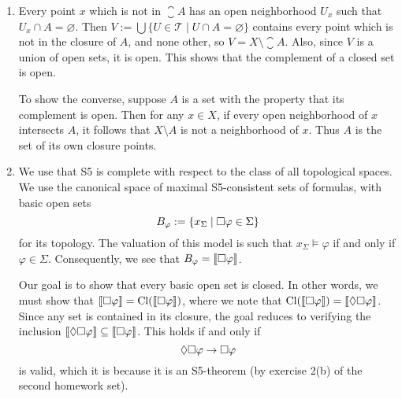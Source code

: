 \documentclass{article}
\newcommand{\topology}{{\mathcal{T}}}
\begin{document}
\maketitle

\begin{ex}
\begin{enumerate}
\item Every point $x$ which is not in $\closure{A}$ has an open neighborhood
$U_x$ such that $U_x\cap A=\varnothing$. Then $V:=\bigcup\{U\in\topology\mid
U\cap A=\varnothing\}$ contains every point which is not in the closure of $A$,
and none other, so $V=X\setminus\closure{A}$. Also, since $V$ is a union of
open sets, it is open. This shows that the complement of a closed set is open.

To show the converse, suppose $A$ is a set with the property that its complement
is open. Then for any $x\in X$, if every open neighborhood of $x$ intersects $A$, it follows that
$X\setminus A$ is not a neighborhood of $x$. Thus $A$ is the set of its own
closure points.

\item We use that \textsf{S5} is complete with respect to the class of all
topological spaces. We use the canonical space of maximal \textsf{S5}-consistent
sets of formulas, with basic open sets
\begin{equation*}
B_{\varphi}:=\{x_\Sigma\mid\square\varphi\in\Sigma\}
\end{equation*}
for its topology. The valuation of this model is such that $x_\Sigma\models\varphi$
if and only if $\varphi\in\Sigma$. Consequently, we see that 
$B_\varphi=\llbracket\square\varphi\rrbracket$.

Our goal is to show that every basic open set is closed. In other words, we must
show that $\llbracket\square\varphi\rrbracket=\mathrm{Cl}(\llbracket\square\varphi\rrbracket)$, where we note
that $\mathrm{Cl}(\llbracket\square\varphi\rrbracket)=\llbracket\lozenge\square\varphi\rrbracket$. Since any set
is contained in its closure, the goal reduces to verifying the inclusion
$\llbracket\lozenge\square\varphi\rrbracket\subseteq\llbracket\square\varphi\rrbracket$. This holds if and only
if 
\begin{equation*}
\lozenge\square\varphi\to\square\varphi
\end{equation*}
is valid, which it is because it is an \textsf{S5}-theorem (by exercise 2(b) of
the second homework set).
\end{enumerate}
\end{ex}
\end{document}
